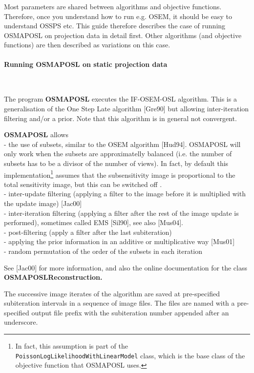 \documentclass{article}
\newcommand{\tab}{\hspace{5mm}}
\newcommand{\subsubsubsection}[1]{\paragraph{#1}\mbox{} \\}
\begin{document}
Most parameters are shared between algorithms and objective functions. Therefore,
once you understand how to run e.g. OSEM, it should be easy to understand OSSPS etc.
This guide therefore describes the case of running OSMAPOSL on projection data in detail
first. Other algorithms (and objective functions) are then described as variations on this
case.

{ \subsubsubsection{Running OSMAPOSL on static projection data}
}
\label{sec:OSMAPOSL}

The program \textbf{OSMAPOSL} executes the IF-OSEM-OSL algorithm. 
This is a generalisation of the One Step Late algorithm [Gre90] but allowing
inter-iteration filtering and/or a prior. Note that this 
algorithm is in general not convergent.

\textbf{OSMAPOSL} 
allows \\
-\tab 
the use of subsets, similar to the OSEM algorithm [Hud94]. OSMAPOSL
will only work when the subsets are approximatelly balanced (i.e.
the number of subsets has to be a divisor of the number of views).
In fact, by default this implementation\footnote{In fact, this assumption
is part of the \texttt{PoissonLogLikelihoodWithLinearModel} class, which is
the base class of the objective function that OSMAPOSL uses.} assumes that the 
subsensitivity image is proportional to the total sensitivity image,
but this can be switched off .\\
-\tab 
inter-update filtering (applying a filter to the image before 
it is multiplied with the update image) [Jac00]\\
-\tab 
inter-iteration filtering (applying a filter after the rest of 
the image update is performed), sometimes called EMS [Sil90], 
see also [Mus04].\\
-\tab 
post-filtering (apply a filter after the last subiteration)\\
-\tab 
applying the prior information in an additive or multiplicative 
way [Mus01]\\
-\tab 
random permutation of the order of the subsets in each iteration


See [Jac00] for more information, and also the online documentation 
for the class \textbf{OSMAPOSLReconstruction.}


The successive image iterates of the algorithm are saved at pre-specified 
subiteration intervals in a sequence of image files. The files 
are named with a pre-specified output file prefix with the subiteration 
number appended after an underscore.
\end{document}
